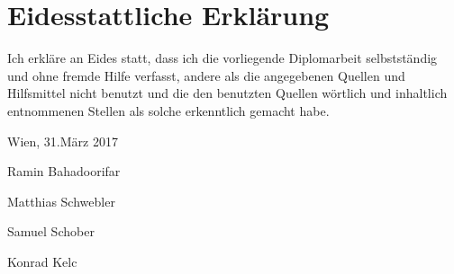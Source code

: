 \section*{Eidesstattliche Erklärung}

Ich erkläre an Eides statt, dass ich die vorliegende Diplomarbeit selbstständig und ohne fremde Hilfe verfasst, andere als die angegebenen Quellen und Hilfsmittel nicht benutzt und die den benutzten Quellen wörtlich und inhaltlich entnommenen Stellen als solche erkenntlich gemacht habe.
\vspace{5em}

Wien, 31.März 2017

\vspace{11em}

\hspace{9cm}
\hrulefill

\hspace{9cm}
Ramin Bahadoorifar
\vspace{2em}

\hspace{9cm}
\hrulefill

\hspace{9cm}
Matthias Schwebler
\vspace{2em}

\hspace{9cm}
\hrulefill

\hspace{9cm}
Samuel Schober
\vspace{2em}

\hspace{9cm}
\hrulefill

\hspace{9cm}
Konrad Kelc
